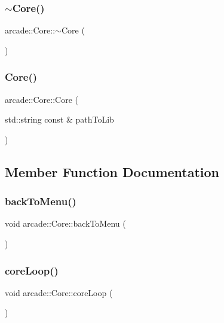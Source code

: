 \subsubsection{\texorpdfstring{$\sim$\+Core()}{~Core()}}
{\footnotesize\ttfamily arcade\+::\+Core\+::$\sim$\+Core (\begin{DoxyParamCaption}{ }\end{DoxyParamCaption})\hspace{0.3cm}{\ttfamily [virtual]}}

\mbox{\label{classarcade_1_1_core_a2d707a14ea555e2b72fb6fb4a6ad0305}} 
\subsubsection{\texorpdfstring{Core()}{Core()}}
{\footnotesize\ttfamily arcade\+::\+Core\+::\+Core (\begin{DoxyParamCaption}\item[{std\+::string const \&}]{path\+To\+Lib }\end{DoxyParamCaption})}



\subsection{Member Function Documentation}
\mbox{\label{classarcade_1_1_core_a2785108b212f43d686484d514478f238}} 
\subsubsection{\texorpdfstring{back\+To\+Menu()}{backToMenu()}}
{\footnotesize\ttfamily void arcade\+::\+Core\+::back\+To\+Menu (\begin{DoxyParamCaption}{ }\end{DoxyParamCaption})}

\mbox{\label{classarcade_1_1_core_a1fd3e057f1a020bd61a074bb2143bac7}} 
\subsubsection{\texorpdfstring{core\+Loop()}{coreLoop()}}
{\footnotesize\ttfamily void arcade\+::\+Core\+::core\+Loop (\begin{DoxyParamCaption}{ }\end{DoxyParamCaption})}

